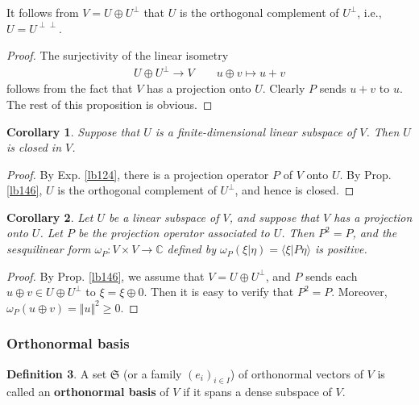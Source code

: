 \documentclass[12pt,b5paper,notitlepage]{article}
\theoremstyle{definition}
\newtheorem{df}{Definition}[subsection]
\theoremstyle{plain}
\newtheorem{co}[df]{Corollary}
\newcommand{\fk}{\mathfrak}
\newcommand{\bk}[1]{\langle {#1}\rangle}
\newcommand{\Cbb}{\mathbb C}
\numberwithin{equation}{section}
\begin{document}
It follows from $V=U\oplus U^\perp$ that $U$ is the orthogonal complement of $U^\perp$, i.e., $U=U^{\perp\perp}$.

\begin{proof}
The surjectivity of the linear isometry
\begin{gather*}
U\oplus U^\perp\rightarrow V\qquad u\oplus v\mapsto u+v
\end{gather*}
follows from the fact that $V$ has a projection onto $U$. Clearly $P$ sends $u+v$ to $u$. The rest of this proposition is obvious.
\end{proof}




\begin{co}
Suppose that $U$ is a finite-dimensional linear subspace of $V$. Then $U$ is closed in $V$.
\end{co}


\begin{proof}
By Exp. \ref{lb124}, there is a projection operator $P$ of $V$ onto $U$. By Prop. \ref{lb146}, $U$ is the orthogonal complement of $U^\perp$, and hence is closed.
\end{proof}


\begin{co}\label{lb171}
Let $U$ be a linear subspace of $V$, and suppose that $V$ has a projection onto $U$. Let $P$ be the projection operator associated to $U$. Then $P^2=P$, and the sesquilinear form $\omega_P:V\times V\rightarrow\Cbb$ defined by $\omega_P(\xi|\eta)=\bk{\xi|P\eta}$ is positive.
\end{co}


\begin{proof}
By Prop. \ref{lb146}, we assume that $V=U\oplus U^\perp$, and $P$ sends each $u\oplus v\in U\oplus U^\perp$ to $\xi=\xi\oplus 0$. Then it is easy to verify that $P^2=P$. Moreover, $\omega_P(u\oplus v)=\Vert u\Vert^2\geq0$.
\end{proof}




\subsubsection{Orthonormal basis}



\begin{df}\label{lb121}
A set $\fk S$ (or a family $(e_i)_{i\in I}$) of orthonormal vectors of $V$ is called an \textbf{orthonormal basis}  of $V$ if it spans a dense subspace of $V$.  
\end{df}
\end{document}
